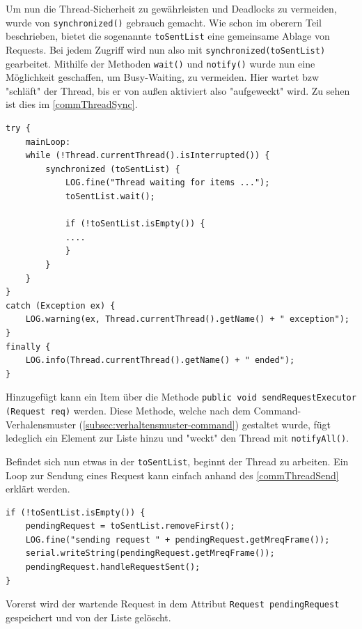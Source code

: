 Um nun die Thread-Sicherheit zu gewährleisten und Deadlocks zu vermeiden, wurde von \lstinline[style=java]{synchronized()} gebrauch gemacht.
Wie schon im oberern Teil beschrieben, bietet die sogenannte \lstinline[style=java]{toSentList} eine gemeinsame Ablage von Requests.
Bei jedem Zugriff wird nun also mit \lstinline[style=java]{synchronized(toSentList)} gearbeitet.
Mithilfe der Methoden \lstinline[style=java]{wait()} und \lstinline[style=java]{notify()} wurde nun eine Möglichkeit geschaffen, um Busy-Waiting, zu vermeiden.
Hier wartet bzw "schläft" der Thread, bis er von außen aktiviert also "aufgeweckt" wird.
Zu sehen ist dies im \autoref{commThreadSync}.
\begin{lstlisting}[style=java,caption=Java-Codebeispiel,label=commThreadSync]
try {
    mainLoop:
    while (!Thread.currentThread().isInterrupted()) {
        synchronized (toSentList) {
            LOG.fine("Thread waiting for items ...");
            toSentList.wait();

            if (!toSentList.isEmpty()) {
            ....
            }
        }
    }
}
catch (Exception ex) {
    LOG.warning(ex, Thread.currentThread().getName() + " exception");
}
finally {
    LOG.info(Thread.currentThread().getName() + " ended");
}
\end{lstlisting}
Hinzugefügt kann ein Item über die Methode \lstinline[style=java]{public void sendRequestExecutor (Request req)} werden.
Diese Methode, welche nach dem Command-Verhalensmuster (\autoref{subsec:verhaltensmuster-command}) gestaltet wurde, fügt ledeglich ein Element zur Liste hinzu und "weckt" den Thread mit \lstinline[style=java]{notifyAll()}.

Befindet sich nun etwas in der \lstinline[style=java]{toSentList}, beginnt der Thread zu arbeiten.
Ein Loop zur Sendung eines Request kann einfach anhand des \autoref{commThreadSend} erklärt werden.
\begin{lstlisting}[style=java,caption=Java-Codebeispiel,label=commThreadSend]
if (!toSentList.isEmpty()) {
    pendingRequest = toSentList.removeFirst();
    LOG.fine("sending request " + pendingRequest.getMreqFrame());
    serial.writeString(pendingRequest.getMreqFrame());
    pendingRequest.handleRequestSent();
}
\end{lstlisting}
Vorerst wird der wartende Request in dem Attribut \lstinline[style=java]{Request pendingRequest} gespeichert und von der Liste gelöscht.
